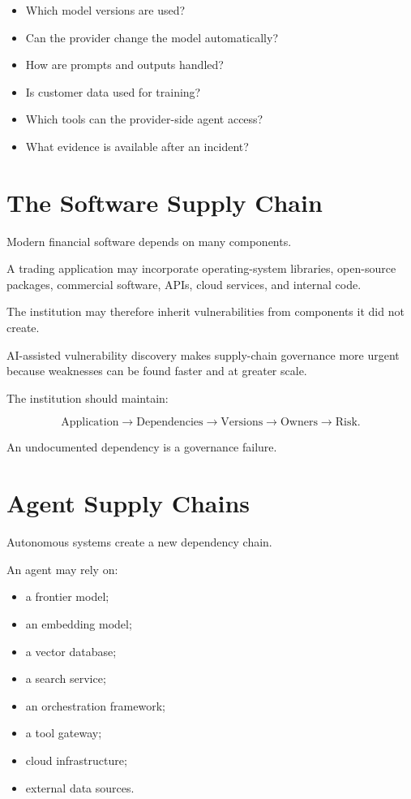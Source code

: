 \begin{itemize}
    \item Which model versions are used?
    \item Can the provider change the model automatically?
    \item How are prompts and outputs handled?
    \item Is customer data used for training?
    \item Which tools can the provider-side agent access?
    \item What evidence is available after an incident?
\end{itemize}

\section{The Software Supply Chain}

Modern financial software depends on many components.

A trading application may incorporate operating-system libraries, open-source packages, commercial software, APIs, cloud services, and internal code.

The institution may therefore inherit vulnerabilities from components it did not create.

AI-assisted vulnerability discovery makes supply-chain governance more urgent because weaknesses can be found faster and at greater scale.

The institution should maintain:

\begin{equation}
\text{Application}
\rightarrow
\text{Dependencies}
\rightarrow
\text{Versions}
\rightarrow
\text{Owners}
\rightarrow
\text{Risk}.
\end{equation}

An undocumented dependency is a governance failure.

\section{Agent Supply Chains}

Autonomous systems create a new dependency chain.

An agent may rely on:

\begin{itemize}
    \item a frontier model;
    \item an embedding model;
    \item a vector database;
    \item a search service;
    \item an orchestration framework;
    \item a tool gateway;
    \item cloud infrastructure;
    \item external data sources.
\end{itemize}

